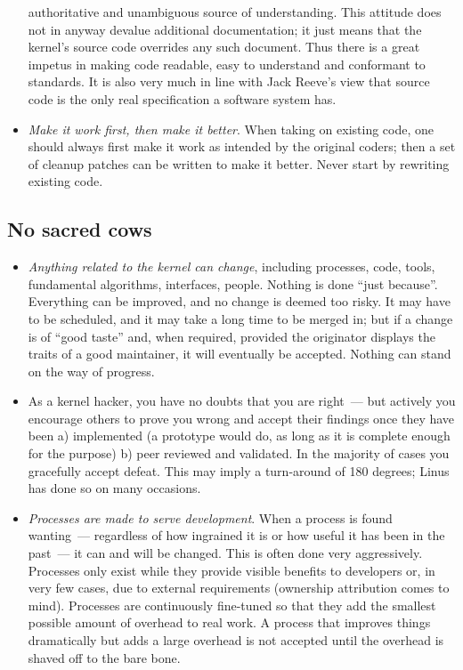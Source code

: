 \documentclass{book}
\begin{document}
\begin{itemize}
  authoritative and unambiguous source of understanding. This attitude
  does not in anyway devalue additional documentation; it just means
  that the kernel's source code overrides any such document. Thus
  there is a great impetus in making code readable, easy to understand
  and conformant to standards. It is also very much in line with Jack
  Reeve's view that source code is the only real specification a
  software system has.
\item \emph{Make it work first, then make it better}. When taking on
  existing code, one should always first make it work as intended by
  the original coders; then a set of cleanup patches can be written to
  make it better. Never start by rewriting existing code.
\end{itemize}

\subsection{No sacred cows}

\begin{itemize}
\item \emph{Anything related to the kernel can change}, including
  processes, code, tools, fundamental algorithms, interfaces,
  people. Nothing is done ``just because''. Everything can be
  improved, and no change is deemed too risky. It may have to be
  scheduled, and it may take a long time to be merged in; but if a
  change is of ``good taste'' and, when required, provided the
  originator displays the traits of a good maintainer, it will
  eventually be accepted. Nothing can stand on the way of progress.
\item As a kernel hacker, you have no doubts that you are right~---
  but actively you encourage others to prove you wrong and accept
  their findings once they have been a) implemented (a prototype would
  do, as long as it is complete enough for the purpose) b) peer
  reviewed and validated. In the majority of cases you gracefully
  accept defeat. This may imply a turn-around of 180 degrees; Linus
  has done so on many occasions.
\item \emph{Processes are made to serve development}. When a process
  is found wanting~--- regardless of how ingrained it is or how useful
  it has been in the past~--- it can and will be changed. This is
  often done very aggressively. Processes only exist while they
  provide visible benefits to developers or, in very few cases, due to
  external requirements (ownership attribution comes to
  mind). Processes are continuously fine-tuned so that they add the
  smallest possible amount of overhead to real work. A process that
  improves things dramatically but adds a large overhead is not
  accepted until the overhead is shaved off to the bare bone.
\end{itemize}
\end{document}

